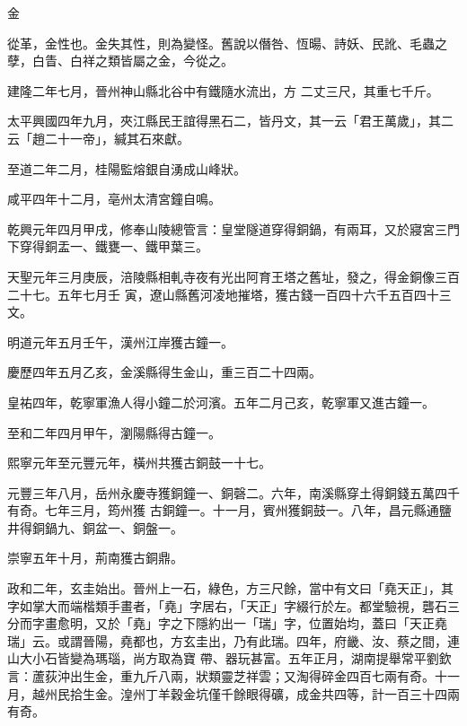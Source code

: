 
\begin{pinyinscope}

 金



 從革，金性也。金失其性，則為變怪。舊說以僭咎、恆暘、詩妖、民訛、毛蟲之孽，白眚、白祥之類皆屬之金，今從之。



 建隆二年七月，晉州神山縣北谷中有鐵隨水流出，方
 二丈三尺，其重七千斤。



 太平興國四年九月，夾江縣民王誼得黑石二，皆丹文，其一云「君王萬歲」，其二云「趙二十一帝」，緘其石來獻。



 至道二年二月，桂陽監熔銀自湧成山峰狀。



 咸平四年十二月，亳州太清宮鐘自鳴。



 乾興元年四月甲戌，修奉山陵總管言：皇堂隧道穿得銅鍋，有兩耳，又於寢宮三門下穿得銅盂一、鐵甕一、鐵甲葉三。



 天聖元年三月庚辰，涪陵縣相軋寺夜有光出阿育王塔之舊址，發之，得金銅像三百二十七。五年七月壬
 寅，遼山縣舊河凌地摧塔，獲古錢一百四十六千五百四十三文。



 明道元年五月壬午，漢州江岸獲古鐘一。



 慶歷四年五月乙亥，金溪縣得生金山，重三百二十四兩。



 皇祐四年，乾寧軍漁人得小鐘二於河濱。五年二月己亥，乾寧軍又進古鐘一。



 至和二年四月甲午，瀏陽縣得古鐘一。



 熙寧元年至元豐元年，橫州共獲古銅鼓一十七。



 元豐三年八月，岳州永慶寺獲銅鐘一、銅磬二。六年，南溪縣穿土得銅錢五萬四千有奇。七年三月，筠州獲
 古銅鐘一。十一月，賓州獲銅鼓一。八年，昌元縣通鹽井得銅鍋九、銅盆一、銅盤一。



 崇寧五年十月，荊南獲古銅鼎。



 政和二年，玄圭始出。晉州上一石，綠色，方三尺餘，當中有文曰「堯天正」，其字如掌大而端楷類手畫者，「堯」字居右，「天正」字綴行於左。都堂驗視，礱石三分而字畫愈明，又於「堯」字之下隱約出一「瑞」字，位置始均，蓋曰「天正堯瑞」云。或謂晉陽，堯都也，方玄圭出，乃有此瑞。四年，府畿、汝、蔡之間，連山大小石皆變為瑪瑙，尚方取為寶
 帶、器玩甚富。五年正月，湖南提舉常平劉欽言：蘆荻沖出生金，重九斤八兩，狀類靈芝祥雲；又淘得碎金四百七兩有奇。十一月，越州民拾生金。湟州丁羊穀金坑僅千餘眼得礦，成金共四等，計一百三十四兩有奇。




\end{pinyinscope}
